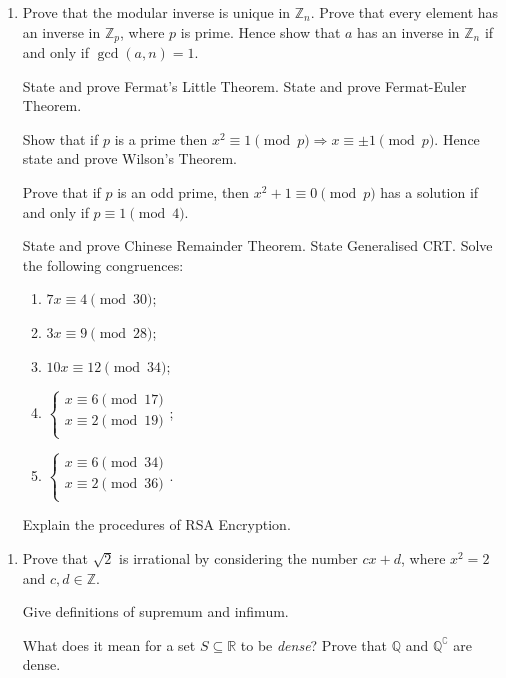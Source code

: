 \documentclass[11pt]{article}
\newcommand{\bbZ}{\mathbb{Z}}
\newlength{\qspace}
\newcounter{qnumber}
\newenvironment{question}%
 {\vspace{\qspace}
  \begin{enumerate}[\bfseries 1\quad][10]%
    \setcounter{enumi}{\value{qnumber}}%
    \item%
 }
{
  \end{enumerate}
  \filbreak
  \stepcounter{qnumber}
 }
\begin{document}
\begin{question}
  Prove that the modular inverse is unique in $ \bbZ_n $. Prove that every element has an inverse in $ \bbZ_p $, where $p$ is prime. Hence show that $a$ has an inverse in $ \bbZ_n $ if and only if $ \gcd(a,n)=1 $.

  State and prove Fermat's Little Theorem. State and prove Fermat-Euler Theorem.

  Show that if $p$ is a prime then $ x^2 \equiv 1 \pmod{p} \Rightarrow x \equiv \pm 1 \pmod p $. Hence state and prove Wilson's Theorem.

  Prove that if $p$ is an odd prime, then $ x^2 +1\equiv 0 \pmod p $ has a solution if and only if $ p \equiv 1 \pmod 4 $.

  State and prove Chinese Remainder Theorem. State Generalised CRT. Solve the following congruences:
  \begin{multicols}{3}
    \begin{enumerate}
      \item $ 7x \equiv 4\pmod{30} $;
      \item $ 3x \equiv 9 \pmod{28} $;
      \item $ 10x \equiv 12 \pmod{{34}} $;
      \item $ \begin{cases}
      x \equiv 6 \pmod{17} \\
      x \equiv 2 \pmod{19} \\
      \end{cases}$;
      \item $ \begin{cases}
        x \equiv 6 \pmod{34} \\
        x \equiv 2 \pmod{36} \\
        \end{cases} $.
    \end{enumerate}
  \end{multicols}

  Explain the procedures of RSA Encryption.
\end{question}

\begin{question}
  Prove that $ \sqrt{2} $ is irrational by considering the number $ cx+d $, where $ x^2=2 $ and $c,d\in\bbZ$.

  Give definitions of supremum and infimum.

  What does it mean for a set $ S \subseteq \mathbb{R} $ to be \textit{dense}? Prove that $ \mathbb{Q} $ and $ \mathbb{Q}^\complement $ are dense.
\end{question}
\end{document}
